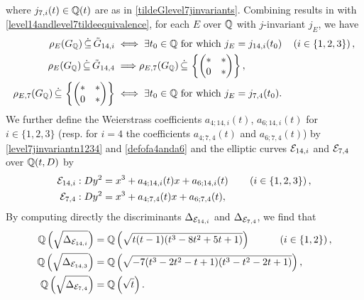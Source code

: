 where $j_{7,i}(t) \in \mathbb{Q}(t)$ are as in \eqref{tildeGlevel7jinvariants}. Combining results in \cite{zywina} with \eqref{level14andlevel7tildeequivalence}, for each $E$ over $\mathbb{Q}$ with $j$-invariant $j_E$, we have
\begin{equation} \label{level14andlevel7modulistatement}
\begin{split}
\rho_{E}(G_{\mathbb{Q}}) \, \dot\subseteq \, \tilde{G}_{14,i} \; &\Longleftrightarrow \; \exists t_0 \in \mathbb{Q} \text{ for which } j_E = j_{14,i}(t_0) \quad \left(i \in \{ 1, 2, 3 \} \right), \\
\rho_{E}(G_{\mathbb{Q}}) \, \dot\subseteq \, \tilde{G}_{14,4} \; &\Longrightarrow \rho_{E,7}(G_{\mathbb{Q}}) \, \dot\subseteq \, \left\{ \begin{pmatrix} * & * \\ 0 & * \end{pmatrix} \right\}, \\
\rho_{E,7}(G_{\mathbb{Q}}) \, \dot\subseteq \, \left\{ \begin{pmatrix} * & * \\ 0 & * \end{pmatrix} \right\} \; &\Longleftrightarrow \; \exists t_0 \in \mathbb{Q} \text{ for which } j_E = j_{7,4}(t_0).
\end{split}
\end{equation}
We further define the Weierstrass coefficients $a_{4;14,i}(t)$, $a_{6;14,i}(t)$ for $i \in \{1, 2, 3\}$ (resp. for $i=4$ the coefficients $a_{4;7,4}(t)$ and $a_{6;7,4}(t)$) by \eqref{level7jinvariantn1234} and \eqref{defofa4anda6} and the elliptic curves $\mathcal{E}_{14,i}$ and $\mathcal{E}_{7,4}$ over $\mathbb{Q}(t,D)$ by
\begin{equation} \label{level14generalmodelscase2}
\begin{split}
\mathcal{E}_{14,i} : \; &Dy^2 = x^3 + a_{4;14,i}(t)x + a_{6;14,i}(t) \quad\quad \left( i \in \{1, 2, 3 \} \right), \\
\mathcal{E}_{7,4} : \; &Dy^2 = x^3 + a_{4;7,4}(t)x + a_{6;7,4}(t),
\end{split}
\end{equation}
By computing directly the discriminants $\Delta_{\mathcal{E}_{14,i}}$ and $\Delta_{\mathcal{E}_{7,4}}$, we find that
\begin{equation} \label{level14quadraticfieldson2side}
\begin{split}
\mathbb{Q}\left( \sqrt{\Delta_{\mathcal{E}_{14,i}}} \right) &= \mathbb{Q}\left( \sqrt{t(t-1)(t^3 - 8t^2 + 5t + 1)} \right) \quad\quad\quad \left( i \in \{ 1, 2 \} \right), \\
\mathbb{Q}\left( \sqrt{\Delta_{\mathcal{E}_{14,3}}} \right) &= \mathbb{Q}\left( \sqrt{-7(t^3 - 2t^2 - t + 1)(t^3 - t^2 - 2t + 1)} \right), \\
\mathbb{Q}\left( \sqrt{\Delta_{\mathcal{E}_{7,4}}} \right) &= \mathbb{Q}\left( \sqrt{t} \right).
\end{split}
\end{equation}
